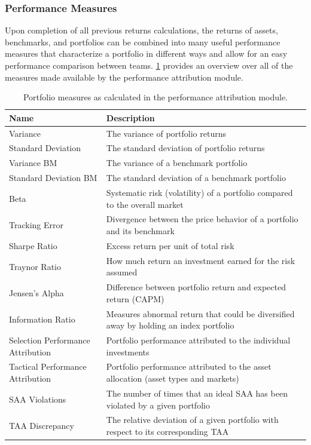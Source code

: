 \subsubsection{Performance Measures}
Upon completion of all previous returns calculations, the returns of assets, benchmarks, and portfolios can be combined into many useful performance measures that characterize a portfolio in different ways and allow for an easy performance comparison between teams. \ref{table:portfolio_measures} provides an overview over all of the measures made available by the performance attribution module.

\begin{table}[h!]
    \begin{tabular}{ll}
      \toprule
      Name & Description \\
      \midrule
      Variance     & The variance of portfolio returns \\
      Standard Deviation     & The standard deviation of portfolio returns \\
      Variance BM & The variance of a benchmark portfolio \\
      Standard Deviation BM & The standard deviation of a benchmark portfolio \\
      Beta & Systematic risk (volatility) of a portfolio compared to the overall market \\
      Tracking Error     & Divergence between the price behavior of a portfolio and its benchmark \\
      Sharpe Ratio     & Excess return per unit of total risk \\
      Traynor Ratio     & How much return an investment earned for the risk assumed \\
      Jensen's Alpha     & Difference between portfolio return and expected return (CAPM) \\
      Information Ratio     & Measures abnormal return that could be diversified away by holding an index portfolio \\
      Selection Performance Attribution & Portfolio performance attributed to the individual investments \\
      Tactical Performance Attribution & Portfolio performance attributed to the asset allocation (asset types and markets) \\
      SAA Violations     & The number of times that an ideal SAA has been violated by a given portfolio \\
      TAA Discrepancy     & The relative deviation of a given portfolio with respect to its corresponding TAA \\
      \bottomrule
    \end{tabular}
    \centering
    \caption{Portfolio measures as calculated in the performance attribution module.}
    \label{table:portfolio_measures}
  \end{table}

